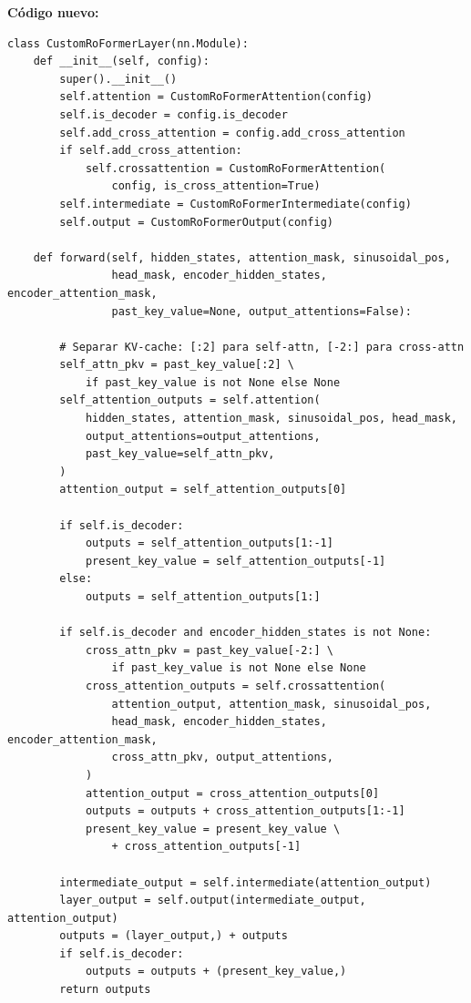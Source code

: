 \documentclass[12pt,a4paper]{article}
\begin{document}
\textbf{Código nuevo:}
\begin{lstlisting}[caption={CustomRoFormerLayer corregida (con forward completo)}]
class CustomRoFormerLayer(nn.Module):
    def __init__(self, config):
        super().__init__()
        self.attention = CustomRoFormerAttention(config)
        self.is_decoder = config.is_decoder
        self.add_cross_attention = config.add_cross_attention
        if self.add_cross_attention:
            self.crossattention = CustomRoFormerAttention(
                config, is_cross_attention=True)
        self.intermediate = CustomRoFormerIntermediate(config)
        self.output = CustomRoFormerOutput(config)

    def forward(self, hidden_states, attention_mask, sinusoidal_pos,
                head_mask, encoder_hidden_states, encoder_attention_mask,
                past_key_value=None, output_attentions=False):

        # Separar KV-cache: [:2] para self-attn, [-2:] para cross-attn
        self_attn_pkv = past_key_value[:2] \
            if past_key_value is not None else None
        self_attention_outputs = self.attention(
            hidden_states, attention_mask, sinusoidal_pos, head_mask,
            output_attentions=output_attentions,
            past_key_value=self_attn_pkv,
        )
        attention_output = self_attention_outputs[0]

        if self.is_decoder:
            outputs = self_attention_outputs[1:-1]
            present_key_value = self_attention_outputs[-1]
        else:
            outputs = self_attention_outputs[1:]

        if self.is_decoder and encoder_hidden_states is not None:
            cross_attn_pkv = past_key_value[-2:] \
                if past_key_value is not None else None
            cross_attention_outputs = self.crossattention(
                attention_output, attention_mask, sinusoidal_pos,
                head_mask, encoder_hidden_states, encoder_attention_mask,
                cross_attn_pkv, output_attentions,
            )
            attention_output = cross_attention_outputs[0]
            outputs = outputs + cross_attention_outputs[1:-1]
            present_key_value = present_key_value \
                + cross_attention_outputs[-1]

        intermediate_output = self.intermediate(attention_output)
        layer_output = self.output(intermediate_output, attention_output)
        outputs = (layer_output,) + outputs
        if self.is_decoder:
            outputs = outputs + (present_key_value,)
        return outputs
\end{lstlisting}
\end{document}
